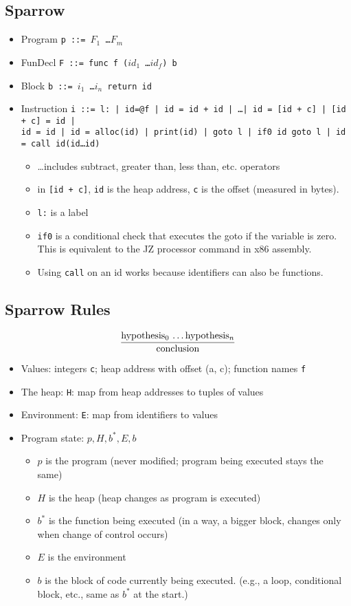 \documentclass[10pt]{article}
\begin{document}
\subsection*{Sparrow}
\begin{itemize}
    \item Program       \texttt{p ::= $F_1$ \dots $F_m$}
    \item FunDecl       \texttt{F ::= func f ($id_1$ \dots $id_f$) b}
    \item Block         \texttt{b ::= $i_1$ \dots $i_n$ return id}
    \item Instruction   \texttt{i ::= l: | id=@f | id = id + id | \dots | id = [id + c] | [id + c] = id |\\ id = id | id = alloc(id) | print(id) | goto l | if0 id goto l | id = call id(id\dots id)}
    \begin{itemize}
        \item \dots includes subtract, greater than, less than, etc. operators
        \item in \texttt{[id + c]}, \texttt{id} is the heap address, \texttt{c} is the offset (measured in bytes).
        \item \texttt{l:} is a label
        \item \texttt{if0} is a conditional check that executes the goto if the variable is zero.  This is equivalent to the JZ processor command in x86 assembly.
        \item Using \texttt{call} on an id works because identifiers can also be functions.
    \end{itemize}
\end{itemize}
\subsection*{Sparrow Rules}
\[\frac{\text{hypothesis$_0$ \dots hypothesis$_n$}}{\text{conclusion}}\]
\begin{itemize}
    \item Values:  integers \texttt{c}; heap address with offset (a, c); function names \texttt{f}
    \item The heap: \texttt{H}: map from heap addresses to tuples of values
    \item Environment: \texttt{E}: map from identifiers to values
    \item Program state: $p, H, b^*, E, b$
    \begin{itemize}
        \item $p$ is the program (never modified; program being executed stays the same)
        \item $H$ is the heap (heap changes as program is executed)
        \item $b^*$ is the function being executed (in a way, a bigger block, changes only when change of control occurs)
        \item $E$ is the environment
        \item $b$ is the block of code currently being executed.  (e.g., a loop, conditional block, etc., same as $b^*$ at the start.)
    \end{itemize}
\end{itemize}  
\end{document}
